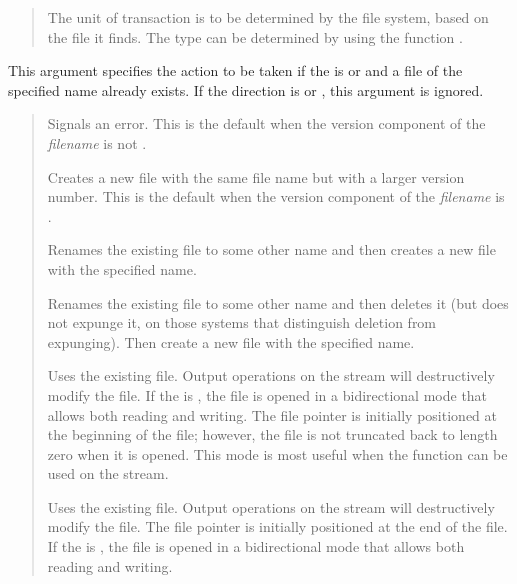 \begin{defun}[Function]
\begin{flushdesc}
\begin{quotation}
\begin{flushdesc}
\item[\cd{:default}]
The unit of transaction is to be determined by the file system, based
on the file it finds.
The type can be determined by using the function .
\end{flushdesc}
\end{quotation}

\item[\cd{:if-exists}]
This argument specifies the action to be taken if the  is
 or  and a file of the specified name already exists.
If the direction is  or , this argument is ignored.
\begin{quotation}
\begin{flushdesc}
\item[\cd{:error}]
Signals an error.  This is the default when the version component of
the {\it filename} is not .

\item[\cd{:new-version}]
Creates a new file with the same file name but with a larger version number.
This is the default when the version component of the {\it filename} is .

\item[\cd{:rename}]
Renames the existing file to some other name and then creates a new file
with the specified name.

\item[\cd{:rename-and-delete}]
Renames the existing file to some other name and then deletes it (but
does not expunge it, on those systems that distinguish deletion from
expunging).  Then create a new file with the specified name.

\item[\cd{:overwrite}]
Uses the existing file.  Output operations on the stream
will destructively modify the file.
If the  is ,
the file is opened in a bidirectional mode that allows both
reading and writing.  The file pointer is initially positioned
at the beginning of the file; however, the file is not truncated
back to length zero when it is opened.
This mode is most useful when
the  function can be used on the stream.

\item[\cd{:append}]
Uses the existing file.  Output operations on the stream
will destructively modify the file.  The file pointer is
initially positioned at the end of the file.
If the  is ,
the file is opened in a bidirectional mode that allows both
reading and writing.


\end{flushdesc}
\end{quotation}
\end{flushdesc}
\end{defun}
